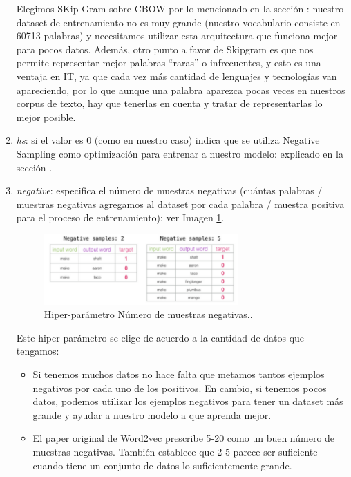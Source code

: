 \documentclass[12pt,a4paper]{article}
\begin{document}
\begin{sloppypar}
\begin{enumerate}
Elegimos SKip-Gram sobre CBOW por lo mencionado en la sección \textit{}: nuestro dataset de entrenamiento no es muy grande (nuestro vocabulario consiste en 60713 palabras) y necesitamos utilizar esta arquitectura que funciona mejor para pocos datos. Además, otro punto a favor de Skipgram es que {nos permite representar mejor palabras “raras” o infrecuentes}, y esto es una ventaja en IT, ya que cada vez más cantidad de lenguajes y tecnologías van apareciendo, por lo que aunque una palabra aparezca pocas veces en nuestros corpus de texto, hay que tenerlas en cuenta y tratar de representarlas lo mejor posible.

\item \textit{hs}: si el valor es 0 (como en nuestro caso) indica que se utiliza Negative Sampling como optimización para entrenar a nuestro modelo: explicado en la sección \textit{}.

\item \textit{negative}: especifica el número de muestras negativas (cuántas palabras / muestras negativas agregamos al dataset por cada palabra / muestra positiva para el proceso de entrenamiento): ver Imagen \ref{fig:6_Neg_samples}.

\begin{figure}[H] 
 \centering
 \includegraphics[width=0.7\textwidth]{images/implementacion_5/6_Neg_samples.png}
\captionsetup{justification=centering,margin=2cm}
 \caption{Hiper-parámetro Número de muestras negativas.\cite{datitos_nlp}.}
 \label{fig:6_Neg_samples}
\end{figure}

Este hiper-parámetro se elige de acuerdo a la cantidad de datos que tengamos\cite{datitos_nlp}:
\begin{itemize}
\item Si tenemos muchos datos no hace falta que metamos tantos ejemplos negativos por cada uno de los positivos. En cambio, si tenemos pocos datos, podemos utilizar los ejemplos negativos para tener un dataset más grande y ayudar a nuestro modelo a que aprenda mejor. 
\item El paper original de Word2vec\cite{NLP_11} prescribe 5-20 como un buen número de muestras negativas. También establece que 2-5 parece ser suficiente cuando tiene un conjunto de datos lo suficientemente grande.
\end{itemize}


\end{enumerate}
\end{sloppypar}
\end{document}
